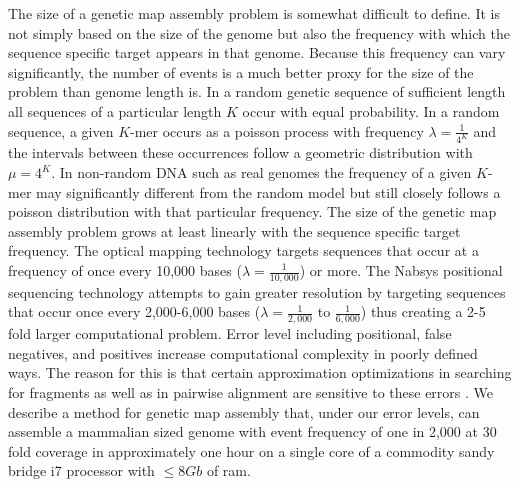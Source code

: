 \documentclass[11pt]{article}
\begin{document}
{The size of a genetic map assembly problem is somewhat difficult to define.  It is not simply based on the size of the genome but also the frequency with which the sequence specific target appears in that genome.  Because this frequency can vary significantly, the number of events is a much better proxy for the size of the problem than genome length is.  In a random genetic sequence of sufficient length all sequences of a particular length $K$ occur with equal probability.  In a random sequence, a given $K$-mer occurs as a poisson process with frequency $\lambda = \frac{1}{4^K}$ and the intervals between these occurrences follow a geometric distribution with $\mu=4^K$. In non-random DNA such as real genomes the frequency of a given $K$-mer may significantly different from the random model but still closely follows a poisson distribution with that particular frequency.  The size of the genetic map assembly problem grows at least linearly with the sequence specific target frequency.  The optical mapping technology targets sequences that occur at a frequency of once every 10,000 bases ($\lambda = \frac{1}{10,000}$) or more.  The Nabsys positional sequencing technology attempts to gain greater resolution by targeting sequences that occur once every 2,000-6,000 bases ($\lambda = \frac{1}{2,000}$ to $\frac{1}{6,000}$) thus creating a 2-5 fold larger computational problem.  Error level including positional, false negatives, and positives increase computational complexity in poorly defined ways.  The reason for this is that certain approximation optimizations in searching for fragments as well as in pairwise alignment are sensitive to these errors \cite{ValouevAlignment}.  We describe a method for genetic map assembly that, under our error levels, can assemble a mammalian sized genome with event frequency of one in 2,000 at 30 fold coverage in approximately one hour on a single core of a commodity sandy bridge i7 processor with $\leq 8Gb$ of ram. }
\end{document}
